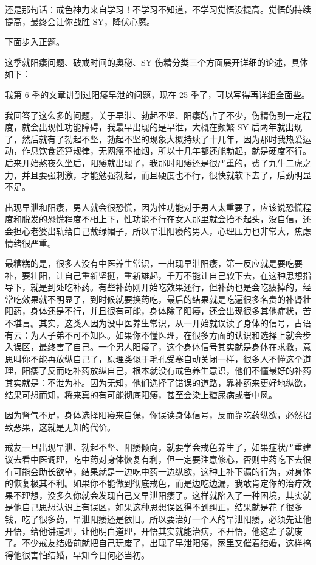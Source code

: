 \documentclass{ctexart}
\begin{document}
还是那句话：戒色神力来自学习！不学习不知道，不学习觉悟没提高。觉悟的持续提高，最终会让你战胜 SY，降伏心魔。

下面步入正题。

这季就阳痿问题、破戒时间的奥秘、SY 伤精分类三个方面展开详细的论述，具体如下：

我第 6 季的文章讲到过阳痿早泄的问题，现在 25 季了，可以写得再详细全面些。

我回答了这么多的问题，关于早泄、勃起不坚、阳痿的占了不少，伤精伤到一定程度，就会出现性功能障碍，我最早出现的是早泄，大概在频繁 SY 后两年就出现了，然后就有了勃起不坚，勃起不坚的现象大概持续了十几年，因为那时我热爱运动，作息饮食还算规律，无网瘾不抽烟，所以十几年都还能勃起，就是硬度不行。后来开始熬夜久坐后，阳痿就出现了，我那时阳痿还是很严重的，费了九牛二虎之力，并且要强刺激，才能勉强勃起，而且硬度也不行，很快就软下去了，后劲明显不足。

出现早泄和阳痿，男人就会很恐慌，因为性功能对于男人太重要了，应该说恐慌程度和脱发的恐慌程度不相上下，性功能不行在女人那里就会抬不起头，没自信，还会担心老婆出轨给自己戴绿帽子，所以早泄阳痿的男人，心理压力也非常大，焦虑情绪很严重。

最糟糕的是，很多人没有中医养生常识，一出现早泄阳痿，第一反应就是要吃要补，要壮阳，让自己重新坚挺，重新雄起，千万不能让自己软下去，在这种思想指导下，就是到处吃补药。有些补药刚开始吃效果还行，但补药也是会吃疲掉的，经常吃效果就不明显了，到时候就要换药吃，最后的结果就是吃遍很多名贵的补肾壮阳药，身体还是不行，并且很有可能，身体除了阳痿，还会出现很多其他症状，苦不堪言。其实，这类人因为没中医养生常识，从一开始就误读了身体的信号，古语有云：为人子弟不可不知医。如果你不懂医理，在很多方面的认识和选择上就会步入误区，最终害了自己。一个男人阳痿了，这个身体信号其实就是身体在求救，意思叫你不能再放纵自己了，原理类似于毛孔受寒自动关闭一样，很多人不懂这个道理，阳痿了反而吃补药放纵自己，根本就没有戒色养生意识，他们不懂最好的补药其实就是：不泄为补。因为无知，他们选择了错误的道路，靠补药来更好地纵欲，结果可想而知，将来真的有可能彻底阳痿，甚至会染上糖尿病或者中风。

因为肾气不足，身体选择阳痿来自保，你误读身体信号，反而靠吃药纵欲，必然招致恶果，这就是无知的代价。

戒友一旦出现早泄、勃起不坚、阳痿倾向，就要学会戒色养生了，如果症状严重建议去看中医调理，吃中药对身体恢复有利，但一定要注意修心，否则中药吃下去很有可能会助长欲望，结果就是一边吃中药一边纵欲，这种上补下漏的行为，对身体的恢复极其不利。如果你不能做到彻底戒色，而是边吃边漏，我敢肯定你的治疗效果不理想，没多久你就会发现自己又早泄阳痿了。这样就陷入了一种困境，其实就是他自己思想认识上有误区，如果这种思想误区得不到纠正，结果就是花了很多钱，吃了很多药，早泄阳痿还是依旧。所以要治好一个人的早泄阳痿，必须先让他开悟，给他讲道理，让他明白道理，开悟其实就能治病，不开悟，他这辈子就废了。不少戒友结婚前就把自己玩废了，出现了早泄阳痿，家里又催着结婚，这样搞得他很害怕结婚，早知今日何必当初。
\end{document}
